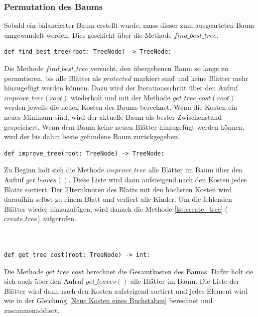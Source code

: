 \documentclass[a4paper,12pt,ngerman]{scrartcl}
\begin{document}
\subsubsection{Permutation des Baums}
Sobald ein balancierter Baum erstellt wurde, muss dieser zum ausgearteten Baum umgewandelt werden. Dies geschieht über die Methode $find\_best\_tree$.
\vspace{2em}
\begin{lstlisting}[caption={\texttt{find\_best\_tree}}, label={lst:find_best_tree}]
  def find_best_tree(root: TreeNode) -> TreeNode:
\end{lstlisting}
Die Methode $find\_best\_tree$ versucht, den übergebenen Baum so lange zu permutieren, bis alle Blätter als $protected$ markiert sind und keine Blätter mehr hinzugefügt werden können.
Dazu wird der Iterationsschritt über den Aufruf $improve\_tree(root)$ wiederholt und mit der Methode $get\_tree\_cost(root)$ werden jeweils die neuen Kosten des Baums berechnet.
Wenn die Kosten ein neues Minimum sind, wird der aktuelle Baum als bester Zwischenstand gespeichert.
Wenn dem Baum keine neuen Blätter hinzugefügt werden können, wird der bis dahin beste gefundene Baum zurückgegeben.
\vspace{2em}
\begin{lstlisting}[caption={\texttt{improve\_tree}}, label={lst:improve_tree}]
  def improve_tree(root: TreeNode) -> TreeNode:
\end{lstlisting}
Zu Beginn holt sich die Methode $improve\_tree$ alle Blätter im Baum über den Aufruf $get\_leaves()$.
Diese Liste wird dann aufsteigend nach den Kosten jedes Blatts sortiert. 
Der Elternknoten des Blatts mit den höchsten Kosten wird daraufhin selbst zu einem Blatt und verliert alle Kinder. 
Um die fehlenden Blätter wieder hinzuzufügen, wird danach die Methode \ref{lst:create_tree}  ($create\_tree$) aufgerufen.\\
\\\\
\begin{lstlisting}[caption={\texttt{get\_tree\_cost}}, label={lst:calculate_tree}]
  def get_tree_cost(root: TreeNode) -> int:
\end{lstlisting}
Die Methode $get\_tree\_cost$ berechnet die Gesamtkosten des Baums. Dafür holt sie sich auch über den Aufruf $get\_leaves()$ alle Blätter im Baum.
Die Liste der Blätter wird dann nach den Kosten aufsteigend sortiert und jedes Element wird wie in der Gleichung \eqref{Neue Kosten eines Buchstaben} berechnet und zusammenaddiert.
\end{document}

